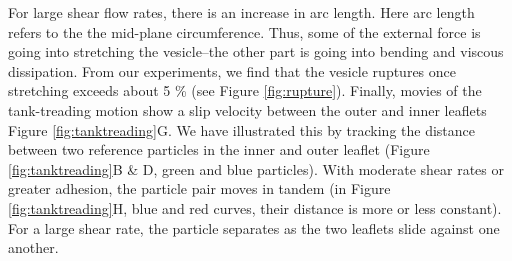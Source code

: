 For large shear flow rates, there is an increase in arc length. Here arc
length refers to the the mid-plane circumference. Thus, some of the
external force is going into stretching the vesicle--the other part is
going into bending and viscous dissipation. From our experiments, we
find that the vesicle ruptures once stretching exceeds about 5 \% (see
Figure \ref{fig:rupture}).  Finally, movies of the tank-treading motion
show a slip velocity between the outer and inner leaflets Figure
\ref{fig:tanktreading}G. We have illustrated this by tracking the
distance between two reference particles in the inner and outer leaflet
(Figure \ref{fig:tanktreading}B \& D, green and blue particles).  With
moderate shear rates or greater adhesion, the particle pair moves in
tandem (in Figure \ref{fig:tanktreading}H, blue and red curves, their
distance is more or less constant).  For a large shear rate, the
particle separates as the two leaflets slide against one another. 



%




